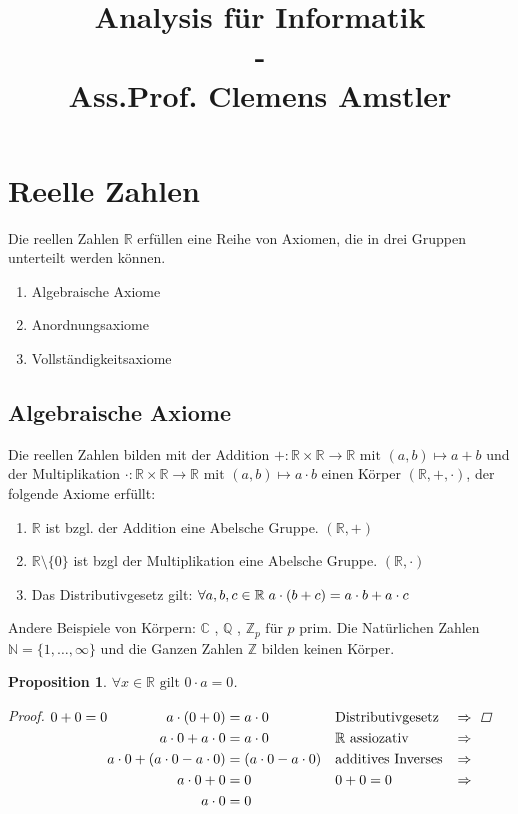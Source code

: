 \documentclass[a4paper,titlepage,oneside]{article}
\title{Analysis für Informatik\small{ \\ - \\ Ass.Prof. Clemens Amstler}}
\def\C{\ensuremath{\mathbb{C}} }
\def\N{\ensuremath{\mathbb{N}} }
\def\Q{\ensuremath{\mathbb{Q}} }
\def\Z{\ensuremath{\mathbb{Z}} }
\def\R{\ensuremath{\mathbb{R}} }
\def\fa{\ensuremath{\forall}}
\def\sp{\hspace{0,1cm}}
\theoremstyle{thmstyle}
\theoremstyle{subthmstyle}
\newtheorem{subprop}[subsatz]{Proposition}
\begin{document}
\onehalfspace

\maketitle

\tableofcontents
\newpage

\section{Reelle Zahlen}
Die reellen Zahlen \R erfüllen eine Reihe von Axiomen, die in drei Gruppen unterteilt werden können.

\begin{enumerate}[label=\Roman*.]
	\item Algebraische Axiome
	\item Anordnungsaxiome
	\item Vollständigkeitsaxiome
\end{enumerate}

\subsection{Algebraische Axiome}
Die reellen Zahlen bilden mit der Addition \( + : \R \times \R \to \R \text{ mit } (a,b) \mapsto a + b\) und der Multiplikation \( \cdot :  \R \times \R \to \R \text{ mit } (a,b) \mapsto a \cdot b \)
einen Körper \((\R, +, \cdot )\), der folgende Axiome erfüllt:
\begin{enumerate}[label=\arabic*)]
	\item \(\R\) ist bzgl. der Addition eine Abelsche Gruppe. \((\R,+)\)
	\item \(\R \setminus \{0\}\) ist bzgl der Multiplikation eine Abelsche Gruppe. \((\R,\cdot)\)
	\item Das Distributivgesetz gilt: \( \fa a,b,c \in \R \sp a \cdot (b + c) = a \cdot b + a \cdot c\)
\end{enumerate}
Andere Beispiele von Körpern: \C, \Q, \(\Z_p \text{ für }p\) prim.
Die Natürlichen Zahlen \(\N = \{1,\dots,\infty \} \) und die Ganzen Zahlen \Z bilden keinen Körper.

\begin{subprop}
\(\fa x \in \R \text{ gilt } 0 \cdot a = 0\).
\begin{proof}
\begin{math}
0+0 = 0 \begin{aligned}[t] a \cdot ( 0 + 0 ) &= a \cdot 0 					&&\text{Distributivgesetz } &\Rightarrow \\
					a \cdot 0 + a \cdot 0 &= a \cdot 0 				&&\text{\R assiozativ} &\Rightarrow\\
					a \cdot 0 + (a \cdot 0 - a \cdot 0) &= (a \cdot 0 - a \cdot 0) 	&& \text{additives Inverses} &\Rightarrow\\
					a \cdot 0 +  0 &= 0	 					&& 0+0 = 0 &\Rightarrow\\
					a \cdot 0 &= 0 \end{aligned}\\
\end{math}
\end{proof}
\end{subprop}
\end{document}
